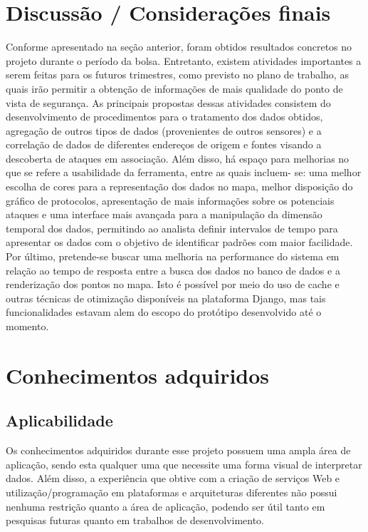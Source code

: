 \documentclass[%
        TwoSidePages,%
        Portuguese,%
        TablesPage,%
        FiguresPage,%
        ]
{ic-tese-v2}
\begin{document}
\chapter{Discussão / Considerações finais}
Conforme apresentado na seção anterior, foram obtidos resultados concretos no projeto durante o período da bolsa. Entretanto, existem atividades importantes a serem feitas para os futuros trimestres, como previsto no plano de trabalho, as quais irão permitir a obtenção de informações de mais qualidade do ponto de vista de segurança. As principais propostas dessas atividades consistem do desenvolvimento de procedimentos para o tratamento dos dados obtidos, agregação de outros tipos de dados (provenientes de outros sensores) e a correlação de dados de diferentes endereços de origem e fontes visando a descoberta de ataques em associação.
Além disso, há espaço para melhorias no que se refere a usabilidade da ferramenta, entre as quais incluem- se: uma melhor escolha de cores para a representação dos dados no mapa, melhor disposição do gráfico de protocolos, apresentação de mais informações sobre os potenciais ataques e uma interface mais avançada para a manipulação da dimensão temporal dos dados, permitindo ao analista definir intervalos de tempo para apresentar os dados com o objetivo de identificar padrões com maior facilidade.
Por último, pretende-se buscar uma melhoria na performance do sistema em relação ao tempo de resposta entre a busca dos dados no banco de dados e a renderização dos pontos no mapa. Isto é possível por meio do uso de cache e outras técnicas de otimização disponíveis na plataforma Django, mas tais funcionalidades estavam alem do escopo do protótipo desenvolvido até o momento.


\chapter{Conhecimentos adquiridos}
\section{Aplicabilidade}
Os conhecimentos adquiridos durante esse projeto possuem uma ampla área de aplicação, sendo esta qualquer uma que necessite uma forma visual de interpretar dados. Além disso, a experiência que obtive com a criação de serviços Web e utilização/programação em plataformas e arquiteturas diferentes não possui nenhuma restrição quanto a área de aplicação, podendo ser útil tanto em pesquisas futuras quanto em trabalhos de desenvolvimento.
\end{document}
